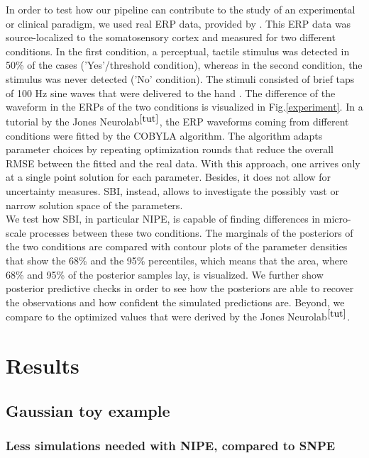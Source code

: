 \documentclass[12pt]{extreport}
\begin{document}
In order to test how our pipeline can contribute to the study of an experimental or clinical paradigm, we used real ERP data, provided by \cite{jones2007neural}. This ERP data was source-localized to the somatosensory cortex and measured for two different conditions. In the first condition, a perceptual, tactile stimulus was detected in 50\% of the cases ('Yes'/threshold condition), whereas in the second condition, the stimulus was never detected ('No' condition). The stimuli consisted of brief taps of 100 Hz sine waves that were delivered to the hand \citep{jones2007neural}.
The difference of the waveform in the ERPs of the two conditions is visualized in Fig.\ref{experiment}. In a tutorial by the Jones Neurolab$^{\ref{tut}}$, the ERP waveforms coming from different conditions were fitted by the COBYLA algorithm. The algorithm adapts parameter choices by repeating optimization rounds that reduce the overall RMSE between the fitted and the real data. 
With this approach, one arrives only at a single point solution for each parameter. Besides, it does not allow for uncertainty measures. SBI, instead, allows to investigate the possibly vast or narrow solution space of the parameters.  \\
We test how SBI, in particular NIPE, is capable of finding differences in micro-scale processes between these two conditions. The marginals of the posteriors of the two conditions are compared with contour plots of the parameter densities that show the 68\% and the 95\% percentiles, which means that the area, where 68\% and 95\% of the posterior samples lay, is visualized.
We further show posterior predictive checks in order to see how the posteriors are able to recover the observations and how confident the simulated predictions are.
Beyond, we compare to the optimized values that were derived by the Jones Neurolab$^{\ref{tut}}$.








\chapter{Results}

\section{Gaussian toy example}


\subsection{Less simulations needed with NIPE, compared to SNPE}
\end{document}
